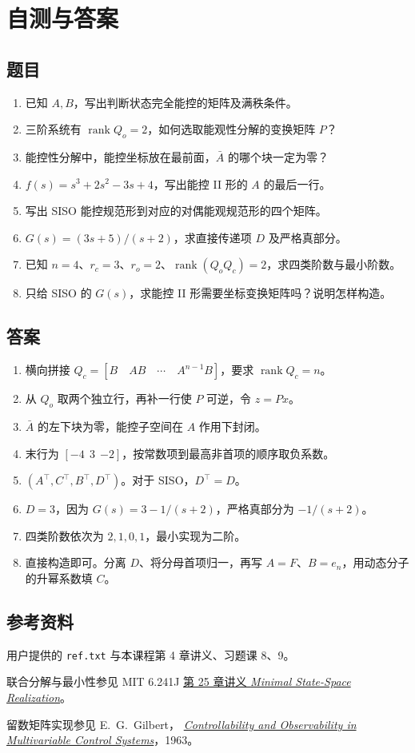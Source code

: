 \documentclass[UTF8,a4paper,12pt,fontset=fandol]{ctexart}
\DeclareMathOperator{\rank}{rank}
\begin{document}
\section{自测与答案}\label{sec:practice}

\subsection*{题目}
\begin{enumerate}
  \item 已知 $A,B$，写出判断状态完全能控的矩阵及满秩条件。
  \item 三阶系统有 $\rank Q_o=2$，如何选取能观性分解的变换矩阵 $P$？
  \item 能控性分解中，能控坐标放在最前面，$\bar A$ 的哪个块一定为零？
  \item $f(s)=s^3+2s^2-3s+4$，写出能控 II 形的 $A$ 的最后一行。
  \item 写出 SISO 能控规范形到对应的对偶能观规范形的四个矩阵。
  \item $G(s)=(3s+5)/(s+2)$，求直接传递项 $D$ 及严格真部分。
  \item 已知 $n=4$、$r_c=3$、$r_o=2$、$\rank(Q_oQ_c)=2$，求四类阶数与最小阶数。
  \item 只给 SISO 的 $G(s)$，求能控 II 形需要坐标变换矩阵吗？说明怎样构造。
\end{enumerate}

\subsection*{答案}
\begin{enumerate}
  \item 横向拼接 $Q_c=[B\quad AB\quad\cdots\quad A^{n-1}B]$，要求 $\rank Q_c=n$。
  \item 从 $Q_o$ 取两个独立行，再补一行使 $P$ 可逆，令 $z=Px$。
  \item $\bar A$ 的左下块为零，能控子空间在 $A$ 作用下封闭。
  \item 末行为 $[-4\ \ 3\ \ {-2}]$，按常数项到最高非首项的顺序取负系数。
  \item $(A^\top,C^\top,B^\top,D^\top)$。对于 SISO，$D^\top=D$。
  \item $D=3$，因为 $G(s)=3-1/(s+2)$，严格真部分为 $-1/(s+2)$。
  \item 四类阶数依次为 $2,1,0,1$，最小实现为二阶。
  \item 直接构造即可。分离 $D$、将分母首项归一，再写 $A=F$、$B=e_n$，用动态分子的升幂系数填 $C$。
\end{enumerate}

\subsection*{参考资料}
\small
用户提供的 \texttt{ref.txt} 与本课程第 4 章讲义、习题课 8、9。

联合分解与最小性参见 MIT 6.241J \href{https://ocw.mit.edu/courses/6-241j-dynamic-systems-and-control-spring-2011/resources/mit6_241js11_chap25/}{第 25 章讲义 \textit{Minimal State-Space Realization}}。

留数矩阵实现参见 E.~G.~Gilbert，
\href{https://people.duke.edu/~hpgavin/SystemID/References/Gilbert-JSIAM-1963.pdf}{\textit{Controllability and Observability in Multivariable Control Systems}}，1963。
\end{document}
